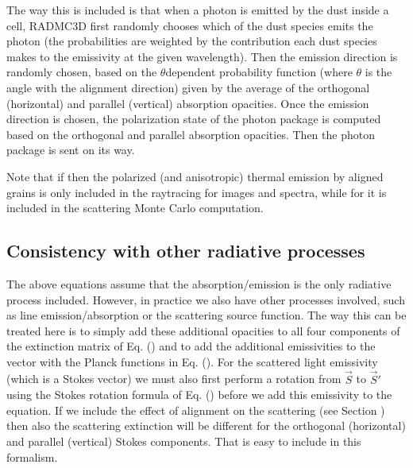 \documentclass[letterpaper,10pt,english]{sphinxmanual}
\begin{document}
The way this is included is that when a photon is emitted by the dust inside a
cell, RADMC\sphinxhyphen{}3D first randomly chooses which of the dust species emits the photon
(the probabilities are weighted by the contribution each dust species makes to
the emissivity at the given wavelength).  Then the emission direction is
randomly chosen, based on the \(\theta\)\sphinxhyphen{}dependent probability function
(where \(\theta\) is the angle with the alignment direction) given by the
average of the orthogonal (horizontal) and parallel (vertical) absorption
opacities. Once the emission direction is chosen, the polarization state of the
photon package is computed based on the orthogonal and parallel absorption
opacities. Then the photon package is sent on its way.

Note that if  then the polarized (and anisotropic)
thermal emission by aligned grains is only included in the ray\sphinxhyphen{}tracing for
images and spectra, while for  it is  included
in the scattering Monte Carlo computation.


\subsection{Consistency with other radiative processes}
\label{\detokenize{dustradtrans:consistency-with-other-radiative-processes}}
The above equations assume that the absorption/emission is the only radiative
process included. However, in practice we also have other processes involved,
such as line emission/absorption or the scattering source function. The way this
can be treated here is to simply add these additional opacities to all four
components of the extinction matrix of
Eq. () and to add the additional
emissivities to the vector with the Planck functions in
Eq. (). For the scattered light
emissivity (which is a Stokes vector) we must also first perform a rotation from
\(\vec S\) to \(\vec S'\) using the Stokes rotation formula of
Eq. () before we add this emissivity to the
equation. If we include the effect of alignment on the scattering (see Section
{\hyperref[\detokenize{dustradtrans:sec-align-scat}]{}}) then also the scattering extinction will be different for
the orthogonal (horizontal) and parallel (vertical) Stokes components. That is
easy to include in this formalism.
\end{document}
